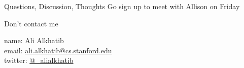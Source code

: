 \documentclass[presentation]{subfiles}
\begin{document}
  \begin{frame}{Questions, Discussion, Thoughts}
  \alert{Go sign up to meet with Allison on Friday}


Don't contact me
    

      name: {Ali Alkhatib} \\
      email: \href{mailto:ali.alkhatib@cs.stanford.edu}{ali.alkhatib@cs.stanford.edu} \\
      twitter: \href{https://twitter.com/_alialkhatib}{@\_alialkhatib} \\
  \end{frame}
\end{document}

